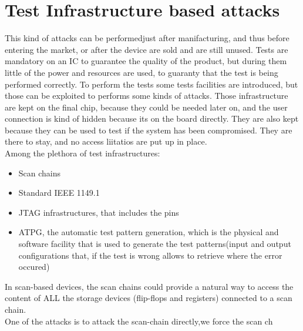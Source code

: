 \chapter{Test Infrastructure based attacks}
This kind of attacks can be performedjust after manifacturing, and thus before entering the market,
or after the device are sold and are still unused.
Tests are mandatory on an IC to guarantee the quality of the product, but during them little of the
power and resources are used, to guaranty that the test is being performed correctly. To perform the
tests some tests facilities are introduced, but those can be exploited to performs some kinds of
attacks. Those infrastructure are kept on the final chip, because they could be needed later on, and
the user connection is kind of hidden because its on the board directly. They are also kept because
they can be used to test if the system has been compromised. They are there to stay, and no access
liitatios are put up in place.\\
Among the plethora of test infrastructures:
\begin{itemize}
  \item Scan chains
  \item Standard IEEE 1149.1
  \item JTAG infrastructures, that includes the pins
  \item ATPG, the automatic test pattern generation, which is the physical and software facility
    that is used to generate the test patterns(input and output configurations that, if the test is
    wrong allows to retrieve where the error occured)
\end{itemize}
In scan-based devices, the scan chains could provide a natural way to access the content of ALL the
storage devices (flip-flops and registers) connected to a scan chain.\\
One of the attacks is to attack the scan-chain directly,we force the scan ch
